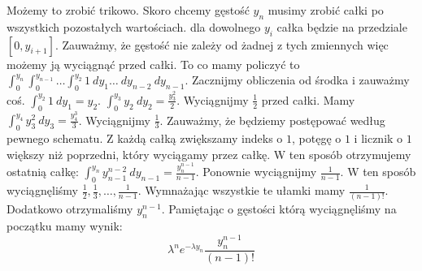 \documentclass[a4paper]{article}
\begin{document}
Możemy to zrobić trikowo. Skoro chcemy gęstość $y_n$ musimy zrobić całki po wszystkich pozostałych wartościach. dla dowolnego $y_i$ całka będzie na przedziale $[0,y_{i+1}]$. Zauważmy, że gęstość nie zależy od żadnej z  tych zmiennych więc możemy ją wyciągnąć przed całki. To co mamy policzyć to $\int_0^{y_n} \int_0^{y_{n-1}} \dots \int_0^{y_2} 1 \ dy_1 \dots \ dy_{n-2}\ dy_{n-1}$. Zacznijmy obliczenia od środka i zauważmy coś. $\int_0^{y_2} 1 \ dy_1 = y_2$. $\int_0^{y_3} y_2 \ dy_2 = \frac{y_3^2}{2}$. Wyciągnijmy $\frac{1}{2}$ przed całki. Mamy $\int_0^{y_4} y_3^2 \ dy_3 = \frac{y_4^3}{3}$. Wyciągnijmy $\frac{1}{3}$. Zauważmy, że będziemy postępować według pewnego schematu. Z każdą całką zwiększamy indeks o $1$, potęgę o $1$ i licznik o $1$ większy niż poprzedni, który wyciągamy przez całkę. W ten sposób otrzymujemy ostatnią całkę: $\int_0^{y_n} y_{n-1}^{n-2} \ dy_{n-1} = \frac{y_n^{n-1}}{n-1}$. Ponownie wyciągnijmy $\frac{1}{n-1}$. W ten sposób wyciągnęliśmy $\frac{1}{2}, \frac{1}{3}, \dots , \frac{1}{n-1}$. Wymnażając wszystkie te ułamki mamy $\frac{1}{(n-1)!}$. Dodatkowo otrzymaliśmy $y_n^{n-1}$. Pamiętając o gęstości którą wyciągnęliśmy na początku mamy wynik:
$$\lambda^n e^{-\lambda y_n}\frac{y_n^{n-1}}{(n-1)!} $$
\end{document}
